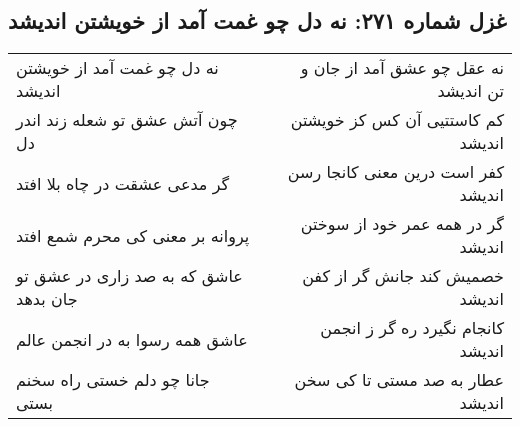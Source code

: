 \begin{center}
\section*{غزل شماره ۲۷۱: نه دل چو غمت آمد از خویشتن اندیشد}
\label{sec:271}
\begin{longtable}{l p{0.5cm} r}
نه دل چو غمت آمد از خویشتن اندیشد
&&
نه عقل چو عشق آمد از جان و تن اندیشد
\\
چون آتش عشق تو شعله زند اندر دل
&&
کم کاستتیی آن کس کز خویشتن اندیشد
\\
گر مدعی عشقت در چاه بلا افتد
&&
کفر است درین معنی کانجا رسن اندیشد
\\
پروانه بر معنی کی محرم شمع افتد
&&
گر در همه عمر خود از سوختن اندیشد
\\
عاشق که به صد زاری در عشق تو جان بدهد
&&
خصمیش کند جانش گر از کفن اندیشد
\\
عاشق همه رسوا به در انجمن عالم
&&
کانجام نگیرد ره گر ز انجمن اندیشد
\\
جانا چو دلم خستی راه سخنم بستی
&&
عطار به صد مستی تا کی سخن اندیشد
\\
\end{longtable}
\end{center}
